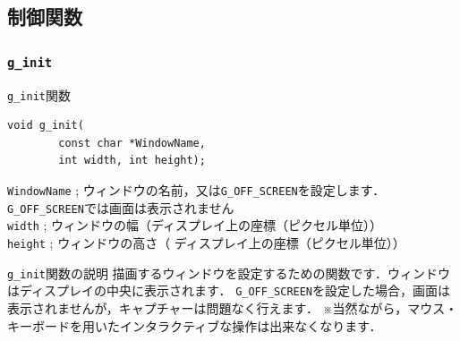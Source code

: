 \documentclass[platex,a4paper,12pt]{jsarticle}%
\begin{document}


\clearpage
\subsection{制御関数}

\subsubsection{\texttt{g\_init}}

\begin{itembox}[l]{\texttt{g\_init}関数}
\begin{verbatim}
void g_init(
        const char *WindowName,
        int width, int height);
\end{verbatim}
\verb|WindowName| ; ウィンドウの名前，又は\verb|G_OFF_SCREEN|を設定します．\verb|G_OFF_SCREEN|では画面は表示されません\\
\verb|width| ; ウィンドウの幅（ディスプレイ上の座標（ピクセル単位））\\
\verb|height| ; ウィンドウの高さ（ ディスプレイ上の座標（ピクセル単位））
\end{itembox}

\begin{itembox}[l]{\texttt{g\_init}関数の説明}
描画するウィンドウを設定するための関数です．ウィンドウはディスプレイの中央に表示されます．
\verb|G_OFF_SCREEN|を設定した場合，画面は表示されませんが，キャプチャーは問題なく行えます．
※当然ながら，マウス・キーボードを用いたインタラクティブな操作は出来なくなります．
\end{itembox}


\clearpage
\end{document}
